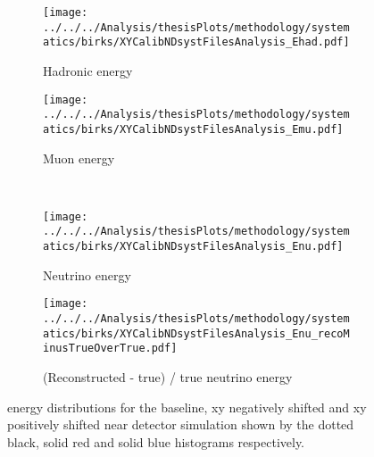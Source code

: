 \begin{figure}%
  \begin{subfigure}{.5\textwidth}
    \centering
    \texttt{[image: ../../../Analysis/thesisPlots/methodology/systematics/birks/XYCalibNDsystFilesAnalysis\_Ehad.pdf]}
    \caption{Hadronic energy}
    \label{fig:systsNDXY_had}
  \end{subfigure}%
  \begin{subfigure}{.5\textwidth}
    \centering
    \texttt{[image: ../../../Analysis/thesisPlots/methodology/systematics/birks/XYCalibNDsystFilesAnalysis\_Emu.pdf]}
    \caption{Muon energy }
    \label{fig:systsNDXY_mu}
  \end{subfigure}\\
  \begin{subfigure}{.5\textwidth}
    \centering
    \texttt{[image: ../../../Analysis/thesisPlots/methodology/systematics/birks/XYCalibNDsystFilesAnalysis\_Enu.pdf]}
    \caption{Neutrino energy}
    \label{fig:systsNDXY_nu}
  \end{subfigure}%
  \begin{subfigure}{.5\textwidth}
    \centering
    \texttt{[image: ../../../Analysis/thesisPlots/methodology/systematics/birks/XYCalibNDsystFilesAnalysis\_Enu\_recoMinusTrueOverTrue.pdf]}
    \caption{(Reconstructed  - true) / true neutrino energy }
    \label{fig:systsNDXY_rmtot}
  \end{subfigure}
  \caption{energy distributions for the baseline, xy negatively
    shifted and xy positively shifted near detector simulation shown
    by the dotted black, solid red and solid blue histograms
    respectively. }
  \label{fig:systsNDXY}
\end{figure}


